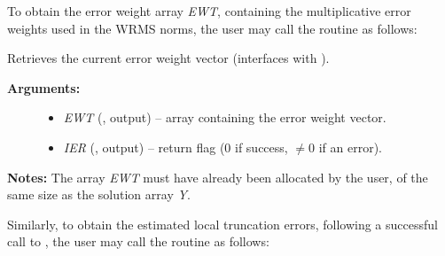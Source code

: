 \documentclass[letterpaper,10pt,english]{sphinxmanual}
\begin{document}
To obtain the error weight array \emph{EWT}, containing the
multiplicative error weights used in the WRMS norms, the user may call
the routine {\hyperref[f_interface/Optional_output:f/_/FARKGETERRWEIGHTS]{\emph{}}} as follows:

\begin{fulllineitems}
\label{f_interface/Optional_output:f/_/FARKGETERRWEIGHTS}
Retrieves the current error weight vector (interfaces
with {\hyperref[c_interface/User_callable:c.ARKodeGetErrWeights]{\emph{}}}).
\begin{description}
\item[{\textbf{Arguments:}}] \leavevmode\begin{itemize}
\item {} 
\emph{EWT} (, output) -- array containing the error
weight vector.

\item {} 
\emph{IER}  (, output) -- return flag  (0 if success,
\(\ne 0\) if an error).

\end{itemize}

\end{description}

\textbf{Notes:}
The array \emph{EWT} must have already been allocated by the user, of
the same size as the solution array \emph{Y}.

\end{fulllineitems}


Similarly, to obtain the estimated local truncation errors, following
a successful call to {\hyperref[f_interface/Usage:f/_/FARKODE]{\emph{}}}, the user may call the
routine {\hyperref[f_interface/Optional_output:f/_/FARKGETESTLOCALERR]{\emph{}}} as follows:
\end{document}
